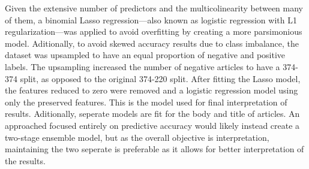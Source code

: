\documentclass[../thesis.tex]{subfiles}
\begin{document}
Given the extensive number of predictors and the multicolinearity between many of them, a binomial Lasso regression---also known as logistic regression with L1 regularization---was applied to avoid overfitting by creating a more parsimonious model. Aditionally, to avoid skewed accuracy results due to class imbalance, the dataset was upsampled to have an equal proportion of negative and positive labels. The upsampling increased the number of negative articles to have a 374-374 split, as opposed to the original 374-220 split. After fitting the Lasso model, the features reduced to zero were removed and a logistic regression model using only the preserved features. This is the model used for final interpretation of results. Aditionally, seperate models are fit for the body and title of articles. An approached focused entirely on predictive accuracy would likely instead create a two-stage ensemble model, but as the overall objective is interpretation, maintaining the two seperate is preferable as it allows for better interpretation of the results.
\end{document}
